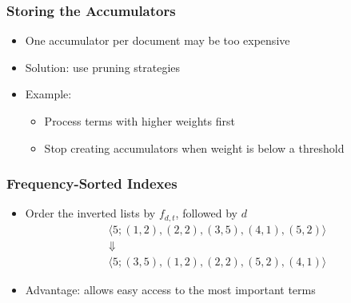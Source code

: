 \documentclass[svgnames]{beamer}
\newcommand{\fdt}{\ensuremath{f_{d,t}}}
\newcommand{\ang}[1]{\ensuremath{\langle #1 \rangle}}
\begin{document}
\begin{frame}
  \frametitle{Storing the Accumulators}
  
  \begin{block}{}
    \begin{itemize}
    \item One accumulator per document may be too expensive
    \item Solution: use \alert{pruning strategies}
    \item Example:
      \begin{itemize}
      \item Process terms with higher weights first
      \item Stop creating accumulators when weight is below a threshold
      \end{itemize}
    \end{itemize}
  \end{block}
\end{frame}


\begin{frame}
  \frametitle{Frequency-Sorted Indexes}

  \begin{block}{}
    \begin{itemize}
    \item Order the inverted lists by \fdt, followed by $d$
      \begin{multline*}
        \ang{ 5; (1,2), (2,2), (3,5), (4,1), (5,2) } \\
        \Downarrow \\
        \ang{ 5; (3,5), (1,2), (2,2), (5,2), (4,1) }
      \end{multline*}
    \item Advantage: \alert{allows easy access to the most important terms}
    \end{itemize}
  \end{block}

\end{frame}

\end{document}

